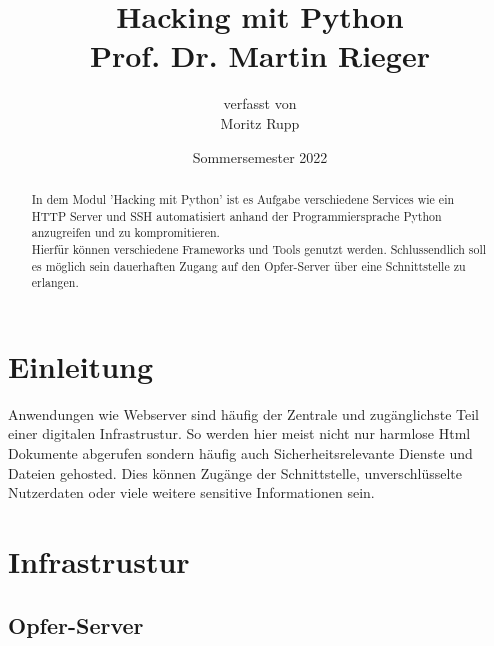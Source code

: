 \documentclass[12pt]{article}
\title{ Hacking mit Python\\\vspace{3mm}\small{ Prof. Dr. Martin Rieger}}
\author{ \small{verfasst von}\\ Moritz Rupp}
\date{Sommersemester 2022}
\begin{document}
\maketitle
\newpage
\tableofcontents
\newpage

\begin{abstract}
\noindent In dem Modul 'Hacking mit Python' ist es Aufgabe verschiedene Services wie ein HTTP Server und SSH automatisiert anhand der Programmiersprache Python anzugreifen und zu kompromitieren.\\ Hierfür können verschiedene Frameworks und Tools genutzt werden. Schlussendlich soll es möglich sein dauerhaften Zugang auf den Opfer-Server über eine Schnittstelle zu erlangen.   
\end{abstract}

\section{Einleitung}
Anwendungen wie Webserver sind häufig der Zentrale und zugänglichste Teil einer digitalen Infrastrustur. So werden hier meist nicht nur harmlose Html Dokumente abgerufen sondern häufig auch Sicherheitsrelevante Dienste und Dateien gehosted. Dies können Zugänge der Schnittstelle, unverschlüsselte Nutzerdaten oder viele weitere sensitive Informationen sein.

\newpage
\section{Infrastrustur}
\subsection{Opfer-Server}
\end{document}

